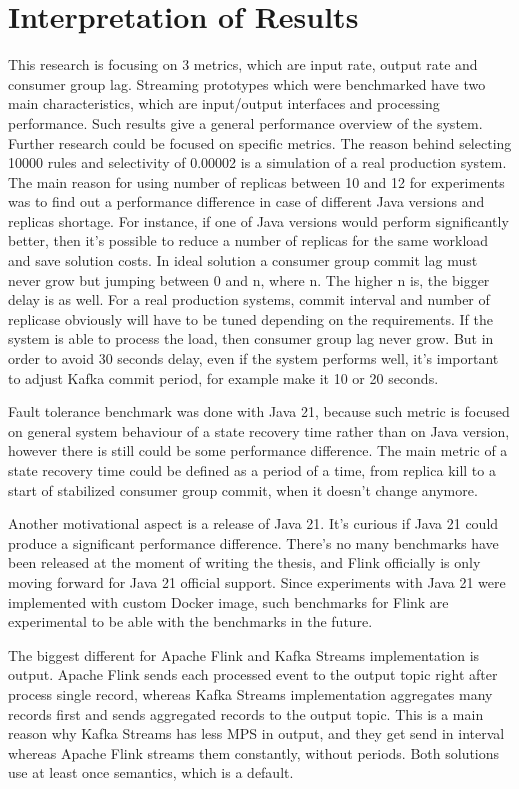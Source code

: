 \section{Interpretation of Results}\label{sec:interpretation-of-results}
This research is focusing on 3 metrics, which are input rate, output rate and consumer group lag.
Streaming prototypes which were benchmarked have two main characteristics, which are
input/output interfaces and processing performance.
Such results give a general performance overview of the system.
Further research could be focused on specific metrics.
The reason behind selecting 10000 rules and selectivity of 0.00002 is a
simulation of a real production system.
The main reason for using number of replicas between 10 and 12 for experiments
was to find out a performance difference in case of different Java versions and replicas shortage.
For instance, if one of Java versions would perform significantly better, then
it's possible to reduce a number of replicas for the same workload and save
solution costs.
In ideal solution a consumer group commit lag must never grow but
jumping between 0 and n, where n.
The higher n is, the bigger delay is as well.
For a real production systems, commit interval and number of replicase
obviously will have to be tuned depending on the requirements.
If the system is able to process the load, then consumer group lag never grow.
But in order to avoid 30 seconds delay, even if the system performs well,
it's important to adjust Kafka commit period, for example make it 10 or 20 seconds.

Fault tolerance benchmark was done with Java 21, because such metric is
focused on general system behaviour of a state recovery time rather than on Java version,
however there is still could be some performance difference.
The main metric of a state recovery time could be defined as a period of a time,
from replica kill to a start of stabilized consumer group commit, when it doesn't
change anymore.

Another motivational aspect is a release of Java 21.
It's curious if Java 21 could produce a significant performance difference.
There's no many benchmarks have been released at the moment of writing the
thesis, and Flink officially is only moving forward for Java 21 official support.
Since experiments with Java 21 were implemented with custom Docker image,
such benchmarks for Flink are experimental to be able with the benchmarks in
the future.

The biggest different for Apache Flink and Kafka Streams implementation is output.
Apache Flink sends each processed event to the output topic right after process single record,
whereas Kafka Streams implementation aggregates many records first and sends aggregated
records to the output topic.
This is a main reason why Kafka Streams has less MPS in output, and they get send
in interval whereas Apache Flink streams them constantly, without periods.
Both solutions use at least once semantics, which is a default.

